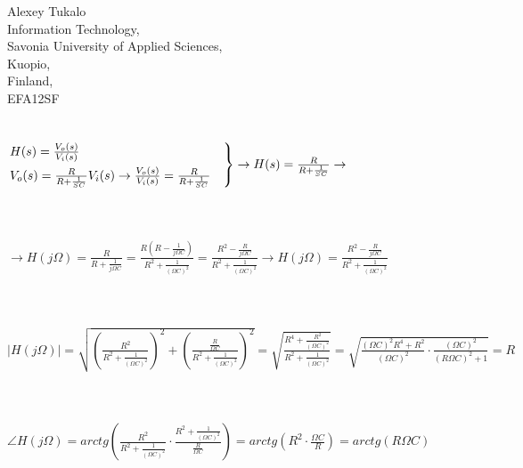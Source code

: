 \documentclass[english]{article}
\date{}
\begin{document}
\begin{flushright}
Alexey Tukalo\\
Information Technology,\\
Savonia University of Applied Sciences,\\
Kuopio,\\
Finland,\\
EFA12SF\\
\end{flushright}


\date{\today}



\section{}

$
\begin{rcases}
 H(s)=\frac{ V_o(s)}{V_i (s)}\\
  V_o(s)=\frac{R}{R+\frac{1}{SC}}V_i (s)
\rightarrow \frac{ V_o(s)}{V_i (s)}=\frac{R}{R+\frac{1}{SC}} \quad
\end{rcases}
\rightarrow	H(s)=\frac{R}{R+\frac{1}{SC}} \rightarrow
$\\\\\\\\
$
\rightarrow H(j \Omega)=\frac{R}{R+\frac{1}{j \Omega C}}=\frac{R(R-\frac{1}{j \Omega C})}{R^2+\frac{1}{ (\Omega C)^2}}=\frac{R^2-\frac{R}{j \Omega C}}{R^2+\frac{1}{ (\Omega C)^2}} \rightarrow H(j \Omega)=\frac{R^2-\frac{R}{j \Omega C}}{R^2+\frac{1}{ (\Omega C)^2}}
$\\\\\\\\
$
|H(j \Omega)|=\sqrt{\left(\frac{R^2}{R^2+\frac{1}{(\Omega C)^2}}\right)^2+\left(\frac{\frac{R}{\Omega C}}{R^2+\frac{1}{(\Omega C)^2}}\right)^2} =\sqrt{\frac{R^4+\frac{R^2}{(\Omega C)^2}}{R^2+\frac{1}{(\Omega C)^2}}}=\sqrt{\frac{(\Omega C)^2 R^4+R^2}{(\Omega C)^2} \cdot \frac{(\Omega C)^2}{(R \Omega C)^2+1}}=R
$\\\\\\\\
$
\angle H(j \Omega)=arctg \left( \frac{R^2}{R^2+\frac{1}{(\Omega C)^2}} \cdot \frac{R^2+\frac{1}{(\Omega C)^2}}{\frac{R}{\Omega C}}  \right)= arctg \left( R^2 \cdot \frac{\Omega C}{R}  \right)=arctg(R \Omega C)
$
\end{document}
